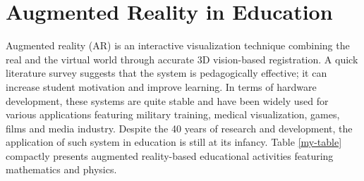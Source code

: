 \documentclass[conference]{IEEEtran}
\begin{document}
\section{Augmented Reality in Education}

Augmented reality (AR) is an interactive visualization technique combining the 
real and the virtual world through accurate 3D vision-based registration. A quick literature survey suggests that the 
system is pedagogically effective; it can increase student motivation and improve learning. In terms of hardware 
development, these systems are quite stable and have been widely used for various applications featuring military 
training, medical visualization, games, films and media industry. Despite the 40 years of research and development, the 
application of such system in education is still at its infancy. Table \ref{my-table} compactly presents augmented 
reality-based educational activities featuring mathematics and physics.
\end{document}

